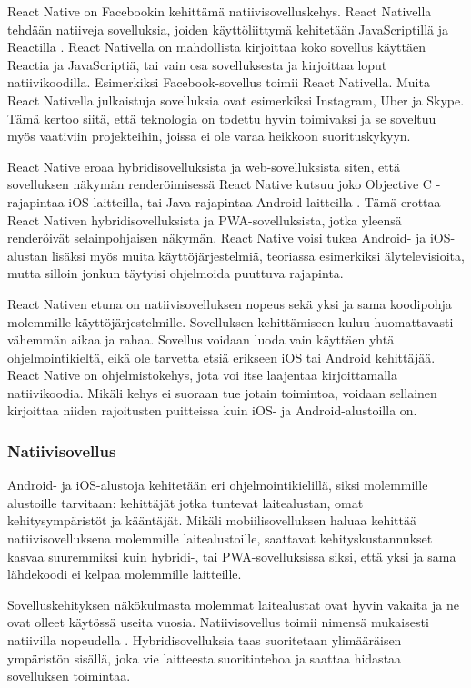 \documentclass{tktltiki}
\begin{document}
React Native on Facebookin kehittämä natiivisovelluskehys. React Nativella tehdään natiiveja sovelluksia, joiden käyttöliittymä kehitetään JavaScriptillä ja Reactilla \cite{Facebook}. React Nativella on mahdollista kirjoittaa koko sovellus käyttäen Reactia ja JavaScriptiä, tai vain osa sovelluksesta ja kirjoittaa loput natiivikoodilla. Esimerkiksi Facebook-sovellus toimii React Nativella. Muita React Nativella julkaistuja sovelluksia ovat esimerkiksi Instagram, Uber ja Skype. Tämä kertoo siitä, että teknologia on todettu hyvin toimivaksi ja se soveltuu myös vaativiin projekteihin, joissa ei ole varaa heikkoon suorituskykyyn.

React Native eroaa hybridisovelluksista ja web-sovelluksista siten, että sovelluksen näkymän renderöimisessä React Native kutsuu joko Objective C -rajapintaa iOS-laitteilla, tai Java-rajapintaa Android-laitteilla \cite{Aggarwal}. Tämä erottaa React Nativen hybridisovelluksista ja PWA-sovelluksista, jotka yleensä renderöivät selainpohjaisen näkymän. React Native voisi tukea Android- ja iOS-alustan lisäksi myös muita käyttöjärjestelmiä, teoriassa esimerkiksi älytelevisioita, mutta silloin jonkun täytyisi ohjelmoida puuttuva rajapinta.

React Nativen etuna on natiivisovelluksen nopeus sekä yksi ja sama koodipohja molemmille käyttöjärjestelmille. Sovelluksen kehittämiseen kuluu huomattavasti vähemmän aikaa ja rahaa. Sovellus voidaan luoda vain käyttäen yhtä ohjelmointikieltä, eikä ole tarvetta etsiä erikseen iOS tai Android kehittäjää. React Native on ohjelmistokehys, jota voi itse laajentaa kirjoittamalla natiivikoodia. Mikäli kehys ei suoraan tue jotain toimintoa, voidaan sellainen kirjoittaa niiden rajoitusten puitteissa kuin iOS- ja Android-alustoilla on.

\subsubsection{Natiivisovellus}

Android- ja iOS-alustoja kehitetään eri ohjelmointikielillä, siksi molemmille alustoille tarvitaan: kehittäjät jotka tuntevat laitealustan, omat kehitysympäristöt ja kääntäjät. Mikäli mobiilisovelluksen haluaa kehittää natiivisovelluksena molemmille laitealustoille, saattavat kehityskustannukset kasvaa suuremmiksi kuin hybridi-, tai PWA-sovelluksissa siksi, että yksi ja sama lähdekoodi ei kelpaa molemmille laitteille. 

Sovelluskehityksen näkökulmasta molemmat laitealustat ovat hyvin vakaita ja ne ovat olleet käytössä useita vuosia. Natiivisovellus toimii nimensä mukaisesti natiivilla nopeudella \cite{6588524}. Hybridisovelluksia taas suoritetaan ylimääräisen ympäristön sisällä, joka vie laitteesta suoritintehoa ja saattaa hidastaa sovelluksen toimintaa. 
\end{document}
